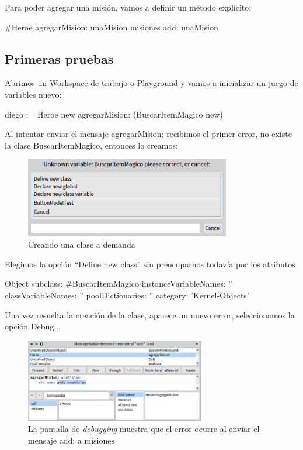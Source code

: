 \documentclass[a4paper,12pt]{book}
\begin{document}
Para poder agregar una misión, vamos a definir un método explícito:

\begin{code}
#Heroe
agregarMision: unaMision
  misiones add: unaMision
\end{code}

\subsection{Primeras pruebas}
Abrimos un Workspace de trabajo o Playground y vamos a inicializar un juego de variables nuevo:

\begin{code}
diego := Heroe new
  agregarMision: (BuscarItemMagico new)
\end{code}

Al intentar enviar el mensaje agregarMision: recibimos el primer error, no existe la clase BuscarItemMagico,
entonces lo creamos:

\begin{figure}[h!]
    \centering	
    \includegraphics[width=0.8\textwidth]{images/16_crear_nueva_clase.png}
    \caption{Creando una clase a demanda}
\end{figure}
\FloatBarrier

Elegimos la opción ``Define new class'' sin preocuparnos todavía por los atributos

\begin{code}
Object subclass: #BuscarItemMagico
		instanceVariableNames: '' 
		classVariableNames: ''
		poolDictionaries: ''
		category: 'Kernel-Objects'
\end{code}

Una vez resuelta la creación de la clase, aparece un nuevo error, seleccionamos la opción Debug...

\begin{figure}[h!]
    \centering	
    \includegraphics[width=0.7\textwidth]{images/11_error_agregarMision.png}
    \caption{La pantalla de \textit{debugging} muestra que el error ocurre al enviar el mensaje add: a misiones}
\end{figure}
\FloatBarrier
\end{document}
